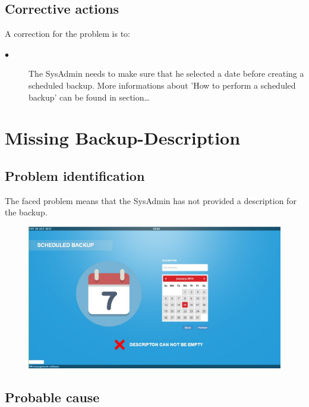 \subsection{Corrective actions}

A correction for the problem is to:\\
\begin{description}
\item[$\bullet$] The SysAdmin needs to make sure that he selected a date before
creating a scheduled backup. More informations about 'How to perform a scheduled
backup' can be found in section\ldots

\end{description}







\section{Missing Backup-Description} 

\subsection{Problem identification}
The faced problem means that the SysAdmin has not provided a description for
the backup.

\begin{figure}[H]
\centering
\includegraphics[width=170mm]{images/descriptionback.eps}
\caption{\label{overflow}}
\end{figure}

\subsection{Probable cause}

